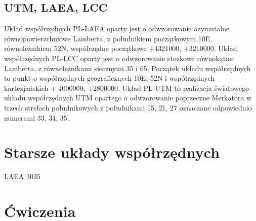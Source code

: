 \documentclass[a4paper,11pt, onecolumn, openany]{memoir}
\begin{document}
			\subsection{UTM, LAEA, LCC}
			Układ współrzędnych PL-LAEA oparty jest o odwzorowanie azymutalne równopowierzchniowe Lamberta, z południkiem początkowym 10E, równoleżnikiem 52N, współrzędne początkowe +4321000, +3210000.
			Układ współrzędnych PL-LCC oparty jest o odwzorowanie stożkowe równokątne Lamberta, z równoleżnikami siecznymi 35 i 65. Początek układu współrzędnych to punkt o współrzędnych geograficznych 10E, 52N i współrzędnych kartezjańskich + 4000000, +2800000.
			Układ PL-UTM to realizacja światowego układu współrzędnych UTM opartego o odwzorowanie poprzeczne Merkatora w trzech strefach południkowych z południkami 15, 21, 27 oznaczane odpowiednio numerami 33, 34, 35.
		\section{Starsze układy współrzędnych}

		LAEA 3035
		\section{Ćwiczenia}
\end{document}
